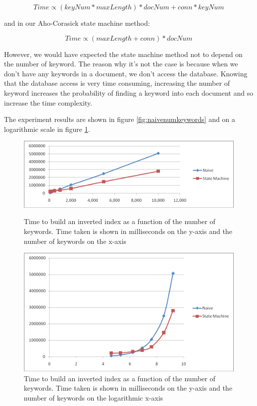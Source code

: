 \documentclass[10pt]{article}
\begin{document}
\[Time \propto (keyNum * maxLength) * docNum + conn * keyNum\]

and in our Aho-Corasick state machine method: 

\[Time \propto (maxLength + conn) * docNum \]

However, we would have expected the state machine method not to depend
on the number of keyword. The reason why it’s not the case is because
when we don’t have any keywords in a document, we don’t access the
database. Knowing that the database access is very time consuming,
increasing the number of keyword increases the probability of finding a
keyword into each document and so increase the time complexity.  

The experiment results are shown in figure \ref{fig:naivenumkeywords}
and on a logarithmic scale in figure \ref{fig:naivenumkeywordslog}.


\begin{figure}[ht]
  \begin{minipage}[b]{0.5\linewidth}
    \centering
    \includegraphics[width=\textwidth]{naivenumkeywords}
    \caption{Time to build an inverted index as a function of the
      number of keywords. Time taken is shown in milliseconds on the
      y-axis and the number of keywords on the x-axis}
    \label{fig:naivenumkeywords}
  \end{minipage}
  \hspace{0.5cm}
  \begin{minipage}[b]{0.5\linewidth}
    \centering
    \includegraphics[width=\textwidth]{naivenumkeywordslog}
    \caption{Time to build an inverted index as a function of the
      number of keywords. Time taken is shown in milliseconds on the
      y-axis and the number of keywords on the logarithmic x-axis}
    \label{fig:naivenumkeywordslog}
  \end{minipage}
\end{figure}
\end{document}
